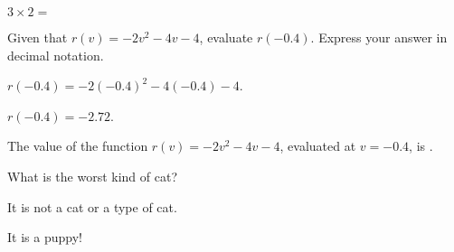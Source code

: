 \documentclass{ximera}
\begin{document}
\begin{exercise}
$3\times 2=$
\end{exercise}


\begin{exercise}
Given that $r(v)=-2 v^2-4 v-4$, evaluate $r(-0.4)$. Express your answer in decimal notation.
\begin{hint}
$r(-0.4)=-2 (-0.4)^2-4 (-0.4)-4$.
\end{hint}
\begin{hint}
$r(-0.4)=-2.72$.
\end{hint}

The value of the function $r(v)=-2 v^2-4 v-4$, evaluated at $v=-0.4$, is .
\end{exercise}



\begin{question}
What is the worst kind of cat?
\begin{prompt}
\begin{multipleChoice}
\end{multipleChoice}
\end{prompt}
\begin{hint}
It is not a cat or a type of cat.
\end{hint}
\begin{hint}
It is a puppy!
\end{hint}
\end{question}
\end{document}

